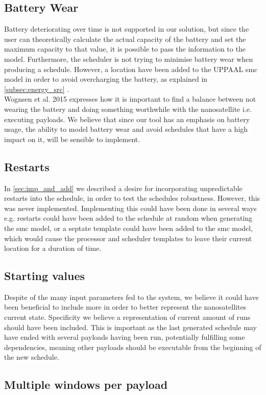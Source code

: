 \subsection{Battery Wear}
Battery deteriorating over time is not supported in our solution, but since the user can theoretically calculate the actual capacity of the battery and set the maximum capacity to that value, it is possible to pass the information to the model. Furthermore, the scheduler is not trying to minimise battery wear when producing a schedule. However, a location have been added to the UPPAAL \gls{smc} model in order to avoid overcharging the battery, as explained in \ref{subsec:energy_src} .\\
Wognsen et al. 2015\cite{score_function} expresses how it is important to find a balance between not wearing the battery and doing something worthwhile with the nanosatellite i.e. executing payloads. We believe that since our tool has an emphasis on battery usage, the ability to model battery wear and avoid schedules that have a high impact on it, will be sensible to implement. 

\subsection{Restarts}
In \cref{sec:imp_and_add} we described a desire for incorporating unpredictable restarts into the schedule, in order to test the schedules robustness. However, this was never implemented. Implementing this could have been done in several ways e.g. restarts could have been added to the schedule at random when generating the \gls{smc} model, or a septate template could have been added to the \gls{smc} model, which would cause the processor and scheduler templates to leave their current location for a duration of time.

\subsection{Starting values} \label{ssec:start_val}
Despite of the many input parameters fed to the system, we believe it could have been beneficial to include more in order to better represent the nanosatellites current state. Specificity we believe a representation of current amount of runs should have been included. This is important as the last generated schedule may have ended with several payloads having been run, potentially fulfilling some dependencies, meaning other payloads should be executable from the beginning of the new schedule.

\subsection{Multiple windows per payload}

